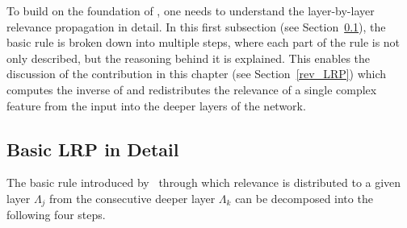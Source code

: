To build on the foundation of \LRP\/, one needs to understand the layer-by-layer relevance propagation in detail. In this first subsection (see Section~\ref{lrp}), the \LRP\/ basic rule is broken down into multiple steps, where each part of the rule is not only described, but the reasoning behind it is explained. This enables the discussion of the contribution in this chapter (see Section~\ref{rev_LRP}) which computes the inverse of \LRP\/ and redistributes the relevance of a single complex feature from the input into the deeper layers of the network.

\subsection{Basic LRP in Detail}
\label{lrp}
The basic \LRP\/ rule introduced by~\cite{bach2015pixel} through which relevance is distributed to a given layer $\Lambda_j$ from the consecutive deeper layer $\Lambda_k$ can be decomposed into the following four steps. 

